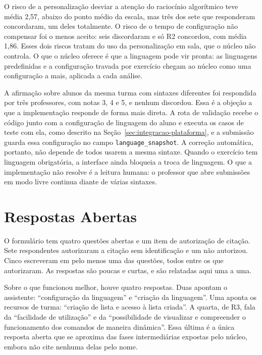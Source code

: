 O risco de a personalização desviar a atenção do raciocínio algorítmico teve média 2,57, abaixo do ponto médio da escala, mas três dos sete que responderam concordaram, um deles totalmente. O risco de o tempo de configuração não compensar foi o menos aceito: seis discordaram e só R2 concordou, com média 1,86. Esses dois riscos tratam do uso da personalização em sala, que o núcleo não controla. O que o núcleo oferece é que a linguagem pode vir pronta: as linguagens predefinidas e a configuração travada por exercício chegam ao núcleo como uma configuração a mais, aplicada a cada análise.

A afirmação sobre alunos da mesma turma com sintaxes diferentes foi respondida por três professores, com notas 3, 4 e 5, e nenhum discordou. Essa é a objeção a que a implementação responde de forma mais direta. A rota de validação recebe o código junto com a configuração de linguagem do aluno e executa os casos de teste com ela, como descrito na Seção~\ref{sec:integracao-plataforma}, e a submissão guarda essa configuração no campo \texttt{language\_snapshot}. A correção automática, portanto, não depende de todos usarem a mesma sintaxe. Quando o exercício tem linguagem obrigatória, a interface ainda bloqueia a troca de linguagem. O que a implementação não resolve é a leitura humana: o professor que abre submissões em modo livre continua diante de várias sintaxes.

\section{Respostas Abertas}
\label{sec:resultado-abertas}

O formulário tem quatro questões abertas e um item de autorização de citação. Sete respondentes autorizaram a citação sem identificação e um não autorizou. Cinco escreveram em pelo menos uma das questões, todos entre os que autorizaram. As respostas são poucas e curtas, e são relatadas aqui uma a uma.

Sobre o que funcionou melhor, houve quatro respostas. Duas apontam o assistente: ``configuração da linguagem'' e ``criação da linguagem''. Uma aponta os recursos de turma: ``criação de lista e acesso à lista criada''. A quarta, de R3, fala da ``facilidade de utilização'' e da ``possibilidade de visualizar e compreender o funcionamento dos comandos de maneira dinâmica''. Essa última é a única resposta aberta que se aproxima das fases intermediárias expostas pelo núcleo, embora não cite nenhuma delas pelo nome.

